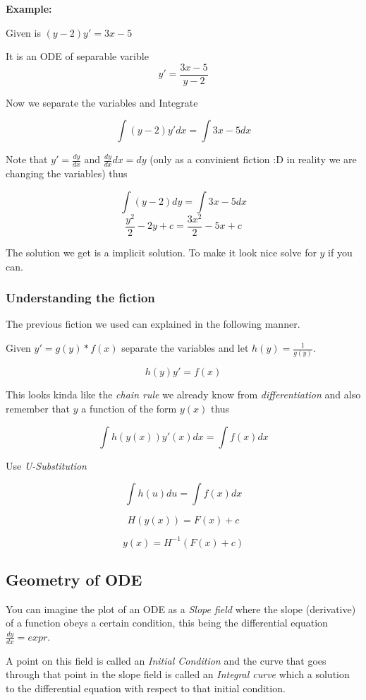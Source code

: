 \textbf{Example:}

Given is \((y - 2)y' = 3x - 5\)

It is an ODE of separable varible
\[y' = \frac{3x - 5}{y - 2}\]

Now we separate the variables and Integrate

\[\int (y - 2)y' dx = \int 3x - 5 dx\]

Note that \(y' = \frac{dy}{dx}\) and \( \frac{dy}{dx} dx = dy\) (only as a convinient fiction :D 
in reality we are changing the variables) thus

\[\int (y - 2)dy = \int 3x - 5 dx\]
\[\frac{y^2}{2} - 2y + c = \frac{3x^2}{2} - 5x + c\]

The solution we get is a implicit solution. To make it look nice solve for \(y\)
if you can.

\subsubsection*{Understanding the fiction}

The previous fiction we used can explained in the following manner.

Given \(y' = g(y)*f(x)\) separate the variables and let \(h(y) = \frac{1}{g(y)}\).

\[h(y)y' = f(x)\]

This looks kinda like the \emph{chain rule} we already know from \emph{differentiation} and
also remember that \(y\) a function of the form \(y(x)\) thus

\[\int h(y(x)) y'(x)dx = \int f(x) dx\]

Use \emph{U-Substitution}

\[\int h(u) du = \int f(x) dx\]

\[H(y(x)) = F(x) + c\]

\[y(x) = H^{-1}(F(x) + c)\]

\QED

\subsection{Geometry of ODE}

You can imagine the plot of an ODE as a \emph{Slope field} where the slope (derivative) of a function
obeys a certain condition, this being the differential equation \(\frac{dy}{dx} = expr\).

A point on this field is called an \emph{Initial Condition} and the curve that goes through
that point in the slope field is called an \emph{Integral curve} which a solution to the differential
equation with respect to that initial condition.

